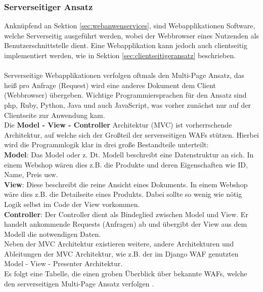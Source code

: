 \subsubsection{Serverseitiger Ansatz}\label{sec:serverseitgeransatz}
Anknüpfend an Sektion \ref{sec:webanwenservices}, sind Webapplikationen Software, welche Serverseitig ausgeführt werden, wobei der Webbrowser eines Nutzenden als Benutzerschnittstelle dient. Eine Webapplikation kann jedoch auch clientseitig implementiert werden, wie in Sektion \ref{sec:clientseitigeransatz} beschrieben. \\ \\
Serverseitige Webapplikationen verfolgen oftmals den Multi-Page Ansatz, das heiß pro Anfrage (Request) wird eine anderes Dokument dem Client (Webbrowser) übergeben. Wichtige Programmiersprachen für den Ansatz sind php, Ruby, Python, Java und auch JavaScript, was vorher zunächst nur auf der Clientseite zur Anwendung kam. \\
Die \textbf{Model - View - Controller} Architektur (MVC) ist vorherrschende Architektur, auf welche sich der Großteil der serverseitigen WAFs stützen.
Hierbei wird die Programmlogik klar in drei große Bestandteile unterteilt: \\
\textbf{Model}: Das Model oder z. Dt. Modell beschreibt eine Datenstruktur an sich. In einem Webshop wären dies z.B. die Produkte und deren Eigenschaften wie ID, Name, Preis usw. \\
\textbf{View}: Diese beschreibt die reine Ansicht eines Dokuments. In einem Webshop wäre dies z.B. die Detailseite eines Produkts. Dabei sollte so wenig wie nötig Logik selbst im Code der View vorkommen. \\
\textbf{Controller}: Der Controller dient als Bindeglied zwischen Model und View. Er handelt ankommende Requests (Anfragen) ab und übergibt der View aus dem Modell die notwendigen Daten. \\ 
Neben der MVC Architektur existieren weitere, andere Architekturen und Ableitungen der MVC Architektur, wie z.B. der im Django WAF genutzten Model - View - Presenter Architektur. \\
Es folgt eine Tabelle, die einen groben Überblick über bekannte WAFs, welche den serverseitigen Multi-Page Ansatz verfolgen \cite{TopWebDe0:online}. 


